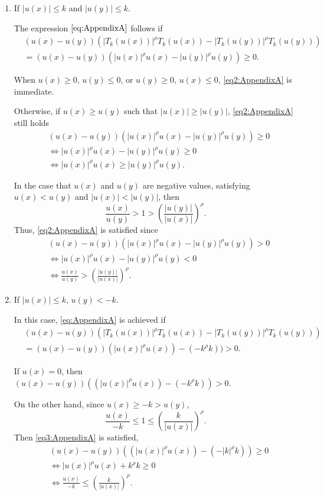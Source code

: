 \documentclass[preprint,12pt]{elsarticle}
\begin{document}
		\begin{enumerate}
			\item If $|u(x)|\leq k$ and $|u(y)|\leq k$.\par
			The expression $\eqref{eq:AppendixA}$ follows if
			\begin{align}\label{eq2:AppendixA}
				&(u(x)-u(y))(|T_k(u(x))|^{\rho}T_k(u(x))-|T_k(u(y))|^{\rho}T_k(u(y)) )
				\\&=(u(x)-u(y))( |u(x)|^{\rho}u(x)-|u(y)|^{\rho}u(y) )\geq 0.\nonumber
			\end{align}
			
			When $u(x)\geq 0$, $u(y)\leq 0$, or $u(y)\geq 0$, $u(x)\leq 0$, \eqref{eq2:AppendixA} is immediate.\par 
			Otherwise, if $u(x)\geq u(y)$ such that $ |u(x)|\geq |u(y)|$, \eqref{eq2:AppendixA} still holds
			\begin{align*}
				&(u(x)-u(y))( |u(x)|^{\rho}u(x)-|u(y)|^{\rho}u(y) )\geq 0
				\\&\iff |u(x)|^{\rho}u(x)-|u(y)|^{\rho}u(y)\geq  0
				\\&\iff |u(x)|^{\rho}u(x)\geq |u(y)|^{\rho}u(y).
			\end{align*}
			
			In the case that $u(x)$ and $u(y)$ are negative values, satisfying $u(x)< u(y)$ and $ |u(x)|< |u(y)|$, then
			\[\frac{u(x)}{u(y)}> 1> \left(\frac{|u(y)|}{|u(x)|}\right)^{\rho}.\]
			Thus, \eqref{eq2:AppendixA} is satisfied since
			\begin{align*}
				&(u(x)-u(y))( |u(x)|^{\rho}u(x)-|u(y)|^{\rho}u(y) )> 0
				\\ &\iff |u(x)|^{\rho}u(x)-|u(y)|^{\rho}u(y) <0
				\\&\iff \frac{u(x)}{u(y)}>\left(\frac{|u(y)|}{|u(x)|}\right)^{\rho}.
			\end{align*}		
		
			\item If $|u(x)|\leq k$, $u(y)<-k$.\par 
			In this case, \eqref{eq:AppendixA} is achieved if
			\begin{align}\label{eq3:AppendixA}
				&(u(x)-u(y))(|T_k(u(x))|^{\rho}T_k(u(x))-|T_k(u(y))|^{\rho}T_k(u(y)))
				\\&=(u(x)-u(y))(|u(x)|^{\rho}u(x))-(-k^{\rho}k))>0.\nonumber
			\end{align}
			
			If $u(x)=0$, then $(u(x)-u(y))((|u(x)|^{\rho}u(x))-(-k^{\rho}k))> 0$.\par 
			On the other hand, since $u(x)\geq -k>u(y)$, 
			\[\frac{u(x)}{-k}\leq 1\leq \left(\frac{k}{|u(x)|}\right)^{\rho}.\]
			Then \eqref{eq3:AppendixA} is satisfied,
			\begin{align*}
				&(u(x)-u(y))((|u(x)|^{\rho}u(x))-(-|k|^{\rho}k))\geq 0
				\\&\iff|u(x)|^{\rho}u(x)+ k^{\rho}k\geq 0
				\\&\iff \frac{u(x)}{-k}\leq \left(\frac{k}{|u(x)|}\right)^{\rho}.
			\end{align*}
		\end{enumerate}
\end{document}

